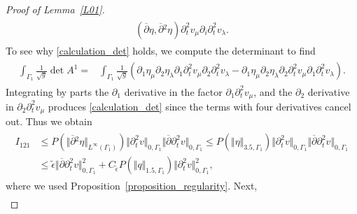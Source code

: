 \documentclass[10pt,reqno]{amsart}
\theoremstyle{plain}
\theoremstyle{definition}
\numberwithin{equation}{section}
\newcommand{\Ga}{\Gamma}
\newcommand{\la}{\lambda}
\newcommand{\norm}[1]{\Vert#1\Vert}
\def\referee#1{{\color{green}\hbox{\bf ~#1~}}} %
\begin{document}
\begin{proof}[Proof of Lemma~\ref{L01}]
\begin{align}
\begin{split}
              (\overline{\partial}{} \eta,\overline{\partial}{}^2 \eta) \partial^2_t v_\mu \partial_i \partial^2_t 
v_\la
.
\end{split}
\label{calculation_det}
\end{align}
To see why \eqref{calculation_det} holds, we compute the determinant to find
\begin{align}
\begin{split}
 \int_{\Ga_1} \frac{1}{\sqrt{g}} \det A^1 = &
  \int_{\Ga_1} \frac{1}{\sqrt{g}} 
( \partial_1 \eta_\mu  
\partial_2 \eta_\la 
\partial_1\partial^2_t v_\mu 
  \partial_2 \partial^2_t  v_\la
-
\partial_1 \eta_\mu
\partial_2 \eta_\la  
\partial_2 \partial^2_t  v_\mu
 \partial_1  \partial^2_t  v_\la
).
\end{split}
\nonumber
\end{align}
Integrating by 
parts the $\partial_1$ derivative 
in the factor $\partial_1\partial^2_t v_\mu $, and 
the $\partial_2$ derivative in 
$\partial_2 \partial^2_t  v_\mu$ produces \eqref{calculation_det} since
the terms with four derivatives cancel out.
Thus we obtain
\begin{align}
\begin{split}
I_{121} 
& 
\leq  P( \norm{\overline{\partial}{}^2 \eta}_{L^\infty(\Ga_1)} ) 
\norm{\partial^2_t v}_{0,\Ga_1} \norm{ \overline{\partial} \partial^2_t v}_{0,\Ga_1}
\leq   P( \norm{\eta}_{3.5,\Ga_1} ) 
\norm{\partial^2_t v}_{0,\Ga_1} \norm{ \overline{\partial} \partial^2_t v}_{0,\Ga_1}
 \\
 & \leq 
  \widetilde{\epsilon}  \norm{ \overline{\partial} \partial^2_t v}_{0,\Ga_1}^2
 +  
    C_{\widetilde{\epsilon}}
    P(\norm{q}_{1.5,\Ga_1} )
    \norm{\partial^2_t v}_{0,\Ga_1}^2,
\end{split}
\nonumber
\end{align}
where we used Proposition~\ref{proposition_regularity}. 
Next,
\begin{align}

\end{align}
\end{proof}
\end{document}
